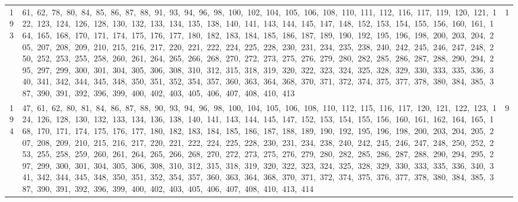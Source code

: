 \begin{longtable}{c|p{}|r}
193 & 61,\ 62,\ 78,\ 80,\ 84,\ 85,\ 86,\ 87,\ 88,\ 91,\ 93,\ 94,\ 96,\ 98,\ 100,\ 102,\ 104,\ 105,\ 106,\ 108,\ 110,\ 111,\ 112,\ 116,\ 117,\ 119,\ 120,\ 121,\ 122,\ 123,\ 124,\ 126,\ 128,\ 130,\ 132,\ 133,\ 134,\ 135,\ 138,\ 140,\ 141,\ 143,\ 144,\ 145,\ 147,\ 148,\ 152,\ 153,\ 154,\ 155,\ 156,\ 160,\ 161,\ 164,\ 165,\ 168,\ 170,\ 171,\ 174,\ 175,\ 176,\ 177,\ 180,\ 182,\ 183,\ 184,\ 185,\ 186,\ 187,\ 189,\ 190,\ 192,\ 195,\ 196,\ 198,\ 200,\ 203,\ 204,\ 205,\ 207,\ 208,\ 209,\ 210,\ 215,\ 216,\ 217,\ 220,\ 221,\ 222,\ 224,\ 225,\ 228,\ 230,\ 231,\ 234,\ 235,\ 238,\ 240,\ 242,\ 245,\ 246,\ 247,\ 248,\ 250,\ 252,\ 253,\ 255,\ 258,\ 260,\ 261,\ 264,\ 265,\ 266,\ 268,\ 270,\ 272,\ 273,\ 275,\ 276,\ 279,\ 280,\ 282,\ 285,\ 286,\ 287,\ 288,\ 290,\ 294,\ 295,\ 297,\ 299,\ 300,\ 301,\ 304,\ 305,\ 306,\ 308,\ 310,\ 312,\ 315,\ 318,\ 319,\ 320,\ 322,\ 323,\ 324,\ 325,\ 328,\ 329,\ 330,\ 333,\ 335,\ 336,\ 340,\ 341,\ 342,\ 344,\ 345,\ 348,\ 350,\ 351,\ 352,\ 354,\ 357,\ 360,\ 363,\ 364,\ 368,\ 370,\ 371,\ 372,\ 374,\ 375,\ 377,\ 378,\ 380,\ 384,\ 385,\ 387,\ 390,\ 391,\ 392,\ 396,\ 399,\ 400,\ 402,\ 403,\ 405,\ 406,\ 407,\ 408,\ 410,\ 413 & 1 \\
194 & 47,\ 61,\ 62,\ 80,\ 81,\ 84,\ 86,\ 87,\ 88,\ 90,\ 93,\ 94,\ 96,\ 98,\ 100,\ 104,\ 105,\ 106,\ 108,\ 110,\ 112,\ 115,\ 116,\ 117,\ 120,\ 121,\ 122,\ 123,\ 124,\ 126,\ 128,\ 130,\ 132,\ 133,\ 134,\ 136,\ 138,\ 140,\ 141,\ 143,\ 144,\ 145,\ 147,\ 152,\ 153,\ 154,\ 155,\ 156,\ 160,\ 161,\ 162,\ 164,\ 165,\ 168,\ 170,\ 171,\ 174,\ 175,\ 176,\ 177,\ 180,\ 182,\ 183,\ 184,\ 185,\ 186,\ 187,\ 188,\ 189,\ 190,\ 192,\ 195,\ 196,\ 198,\ 200,\ 203,\ 204,\ 205,\ 207,\ 208,\ 209,\ 210,\ 215,\ 216,\ 217,\ 220,\ 221,\ 222,\ 224,\ 225,\ 228,\ 230,\ 231,\ 234,\ 238,\ 240,\ 242,\ 245,\ 246,\ 247,\ 248,\ 250,\ 252,\ 253,\ 255,\ 258,\ 259,\ 260,\ 261,\ 264,\ 265,\ 266,\ 268,\ 270,\ 272,\ 273,\ 275,\ 276,\ 279,\ 280,\ 282,\ 285,\ 286,\ 287,\ 288,\ 290,\ 294,\ 295,\ 297,\ 299,\ 300,\ 301,\ 304,\ 305,\ 306,\ 308,\ 310,\ 312,\ 315,\ 318,\ 319,\ 320,\ 322,\ 323,\ 324,\ 325,\ 328,\ 329,\ 330,\ 333,\ 335,\ 336,\ 340,\ 341,\ 342,\ 344,\ 345,\ 348,\ 350,\ 351,\ 352,\ 354,\ 357,\ 360,\ 363,\ 364,\ 368,\ 370,\ 371,\ 372,\ 374,\ 375,\ 376,\ 377,\ 378,\ 380,\ 384,\ 385,\ 387,\ 390,\ 391,\ 392,\ 396,\ 399,\ 400,\ 402,\ 403,\ 405,\ 406,\ 407,\ 408,\ 410,\ 413,\ 414 & 9 \\

\end{longtable}
